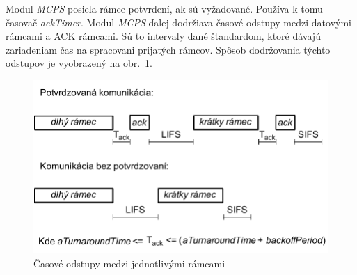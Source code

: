 \indent\indent Modul \textit{MCPS} posiela rámce potvrdení, ak sú vyžadované. Používa k tomu časovač \textit{ackTimer}. Modul\textit{ MCPS} ďalej dodržiava časové odstupy medzi datovými rámcami a ACK rámcami. Sú to intervaly dané štandardom, ktoré dávajú zariadeniam čas na spracovani prijatých rámcov. Spôsob dodržovania týchto odstupov je vyobrazený na obr.~\ref{fig:interframe_spacing}.\\

\begin{figure}[htbp]
\begin{center}
\includegraphics[width=120mm]{figures/interframe_spacing}
\caption{Časové odstupy medzi jednotlivými rámcami}
\label{fig:interframe_spacing}
\end{center}
\end{figure}

